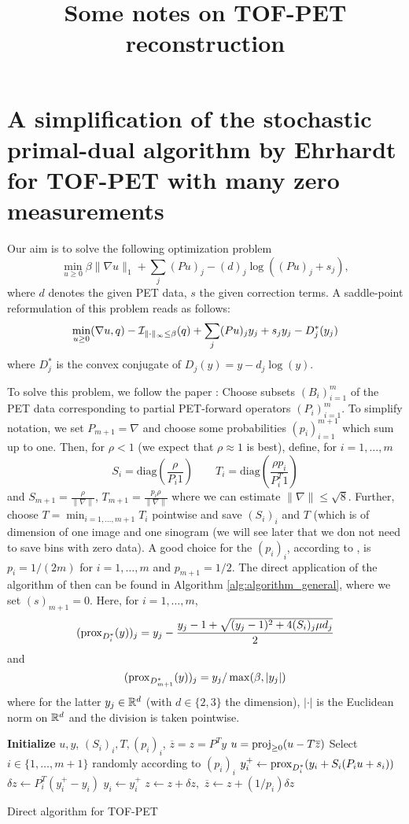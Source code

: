 \documentclass{article}
\title{Some notes on TOF-PET reconstruction}
\author{}
\date{}
\begin{document}
\section{A simplification of the stochastic primal-dual algorithm by Ehrhardt for TOF-PET with many zero measurements}
Our aim is to solve the following optimization problem
\[ \min _{u\geq 0} \beta \|\nabla u\|_1 + \sum_j (Pu)_ j -  (d)_j \log( (Pu)_ j + s_ j ) ,\]
where $d$ denotes the given PET data, $s$ the given correction terms. A saddle-point reformulation of this problem reads as follows:
\[ \min _{u\geq 0} (\nabla u,q) - \mathcal{I}_{\|\cdot \|_\infty \leq \beta} (q) + \sum_j (Pu)_jy_j + s_jy_j - D_j^*(y_j) \]
where $D_j^*$ is the convex conjugate of $D_j(y) = y - d_j \log(y)$. 

To solve this problem, we follow the paper \cite{Ehrhardt2019}: Choose subsets $(B_i)_{i=1}^m$ of the PET data corresponding to partial PET-forward operators $(P_i)_{i=1}^m$. To simplify notation, we set $P_{m+1} = \nabla$ and choose some probabilities $(p_i)_{i=1}^{m+1}$ which sum up to one. Then, for $\rho<1$ (we expect that $\rho\approx 1$ is best), define, for $i=1,\ldots,m$
\[ S_i = \text{diag}(\frac{\rho}{P_i 1} )\qquad  T_i = \text{diag}(\frac{\rho p_i}{P^T_i 1}) \]
and $S_{m+1} = \frac{\rho}{\|\nabla\|}$, $T_{m+1} = \frac{p_i\rho}{\|\nabla\|}$ where we can estimate $\|\nabla \| \leq \sqrt{8}$. Further, choose $T = \min_{i=1,\ldots,m+1} T_i$ pointwise and save $(S_i)_i$ and $T$ (which is of dimension of one image and one sinogram (we will see later that we don not need to save bins with zero data). A good choice for the $(p_i)_i$, according to \cite{Ehrhardt2019}, is $p_i = 1/(2m)$ for $i=1,\ldots,m$ and $p_{m+1} = 1/2$. The direct application of the algorithm of \cite{Ehrhardt2019} then can be found in Algorithm  \ref{alg:algorithm_general}, where we set $(s)_{m+1} = 0$.  Here, for $i=1,\ldots,m$, 
\[ (\operatorname{prox}_{D_i^*}(y))_j = y_j - \frac{y_j - 1 + \sqrt{ (y_j-1)^2 + 4 (S_i)_j \mu d_j}}{2}\]
and 
\[ (\operatorname{prox}_{D_{m+1}^*}(y) )_j = y_j /\max(\beta,|y_j|) \]
where for the latter $y_j \in \mathbb{R}^d$ (with $d \in \{2,3\}$ the dimension), $|\cdot |$ is the Euclidean norm on $\mathbb{R}^d$ and the division is taken pointwise.

\begin{algorithm}[t]
  \begin{algorithmic}[1]
\onehalfspacing


\State \textbf{Initialize} $u,y$, $(S_i)_i,T,(p_i)_i$, $\overline{z}= z = P^T y$
\Repeat
	\State $u = \operatorname{proj}_{\geq 0} (u - T \overline{z})$
	\State Select $i \in \{ 1,\ldots,m+1\} $ randomly according to $(p_i)_i$
	\State \quad $y_i^+ \gets \operatorname{prox}_{D_i^*} ( y_i + S_i  ( P_i u + s_i))$
	\State \quad $\delta z \gets P_i^T (y_i^+ - y_i)$
	\State \quad $y_i \gets y_i^+$
	\State $z \gets z + \delta z, $
	\State $\overline{z} \gets  z + (1/p_i) \delta z$
\State {}
\EndFunction
\end{algorithmic}
\caption{Direct algorithm for TOF-PET}\label{alg:algorithm_general}
\end{algorithm}
\end{document}
